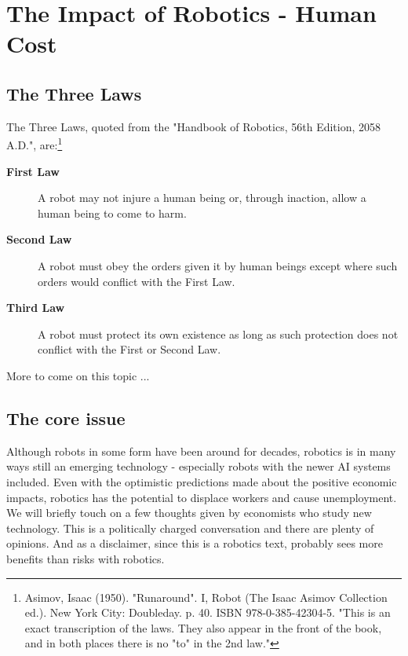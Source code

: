 \hypertarget{the-impact-of-robotics---human-cost}{%
\section{The Impact of Robotics - Human
Cost}\label{the-impact-of-robotics---human-cost}}

\hypertarget{the-three-laws}{%
\subsection{The Three Laws}\label{the-three-laws}}

The Three Laws, quoted from the "Handbook of Robotics, 56th Edition,
2058 A.D.", are:\footnote{Asimov, Isaac (1950). "Runaround". I, Robot
  (The Isaac Asimov Collection ed.). New York City: Doubleday. p. 40.
  ISBN 978-0-385-42304-5. "This is an exact transcription of the laws.
  They also appear in the front of the book, and in both places there is
  no "to" in the 2nd law."}

\begin{description}
\item[\textbf{First Law}]
A robot may not injure a human being or, through inaction, allow a human
being to come to harm.
\item[\textbf{Second Law}]
A robot must obey the orders given it by human beings except where such
orders would conflict with the First Law.
\item[\textbf{Third Law}]
A robot must protect its own existence as long as such protection does
not conflict with the First or Second Law.
\end{description}

More to come on this topic ...

\hypertarget{the-core-issue}{%
\subsection{The core issue}\label{the-core-issue}}

Although robots in some form have been around for decades, robotics is
in many ways still an emerging technology - especially robots with the
newer AI systems included. Even with the optimistic predictions made
about the positive economic impacts, robotics has the potential to
displace workers and cause unemployment. We will briefly touch on a few
thoughts given by economists who study new technology. This is a
politically charged conversation and there are plenty of opinions. And
as a disclaimer, since this is a robotics text, probably sees more
benefits than risks with robotics.

